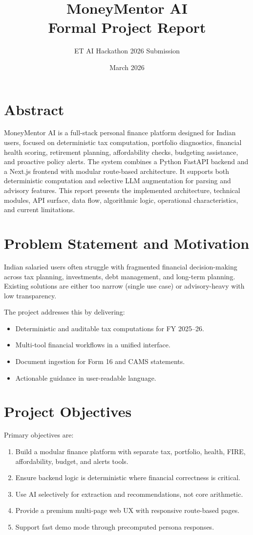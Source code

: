 \documentclass[12pt,a4paper]{article}
\title{\textbf{MoneyMentor AI}\\
Formal Project Report}
\author{ET AI Hackathon 2026 Submission}
\date{March 2026}
\begin{document}
\maketitle
\tableofcontents
\newpage

\section{Abstract}
MoneyMentor AI is a full-stack personal finance platform designed for Indian users, focused on deterministic tax computation, portfolio diagnostics, financial health scoring, retirement planning, affordability checks, budgeting assistance, and proactive policy alerts. The system combines a Python FastAPI backend and a Next.js frontend with modular route-based architecture. It supports both deterministic computation and selective LLM augmentation for parsing and advisory features. This report presents the implemented architecture, technical modules, API surface, data flow, algorithmic logic, operational characteristics, and current limitations.

\section{Problem Statement and Motivation}
Indian salaried users often struggle with fragmented financial decision-making across tax planning, investments, debt management, and long-term planning. Existing solutions are either too narrow (single use case) or advisory-heavy with low transparency.

The project addresses this by delivering:
\begin{itemize}
	\item Deterministic and auditable tax computations for FY 2025--26.
	\item Multi-tool financial workflows in a unified interface.
	\item Document ingestion for Form 16 and CAMS statements.
	\item Actionable guidance in user-readable language.
\end{itemize}

\section{Project Objectives}
Primary objectives are:
\begin{enumerate}
	\item Build a modular finance platform with separate tax, portfolio, health, FIRE, affordability, budget, and alerts tools.
	\item Ensure backend logic is deterministic where financial correctness is critical.
	\item Use AI selectively for extraction and recommendations, not core arithmetic.
	\item Provide a premium multi-page web UX with responsive route-based pages.
	\item Support fast demo mode through precomputed persona responses.
\end{enumerate}
\end{document}
